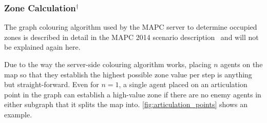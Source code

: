 \subsubsection[Zone Calculation]{Zone Calculation$^\dagger$}
\label{alg:zon_calculation}
The graph colouring algorithm used by the MAPC server to determine occupied zones is described in detail in the MAPC 2014 scenario description~\cite{ahlbrecht_mapc_2014} and will not be explained again here.


Due to the way the server-side colouring algorithm works, placing $n$ agents on the map so that they establish the highest possible zone value per step is anything but straight-forward.
Even for $n = 1$, a single agent placed on an articulation point in the graph can establish a high-value zone if there are no enemy agents in either subgraph that it splits the map into.
\autoref{fig:articulation_points} shows an example.
